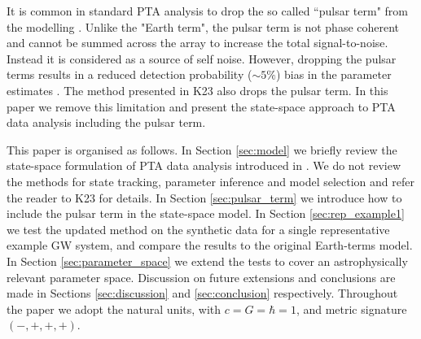 \documentclass[fleqn,usenatbib,useAMS]{mnras}
\begin{document}
 
 
 It is common in standard PTA analysis to drop the so called ``pulsar term" from the modelling \citep[e.g.][]{Sesana2010,Babak2012,Petiteau2013,Zhu2015,Taylors2016,Goldstein2018,Charisi2023arXiv230403786C}. Unlike the "Earth term", the pulsar term is not phase coherent and cannot be summed across the array to increase the total signal-to-noise. Instead it is considered as a source of self noise. However, dropping the pulsar terms results in a reduced detection probability ($\sim 5 \%$) bias in the parameter estimates \citep{Zhupulsarterms,Chen2022}. The method presented in K23 also drops the pulsar term. In this paper we remove this limitation and present the state-space approach to PTA data analysis including the pulsar term. \newline 
 
 
 This paper is organised as follows. In Section \ref{sec:model} we briefly review the state-space formulation of PTA data analysis introduced in \cite{K1}. We do not review the methods for state tracking, parameter inference and model selection and refer the reader to K23 for details. In Section \ref{sec:pulsar_term} we introduce how to include the pulsar term in the state-space model. In Section \ref{sec:rep_example1} we test the updated method on the synthetic data for a single representative example GW system, and compare the results to the original Earth-terms model. In Section \ref{sec:parameter_space} we extend the tests to cover an astrophysically relevant parameter space. Discussion on future extensions and conclusions are made in Sections \ref{sec:discussion} and \ref{sec:conclusion} respectively. Throughout the paper we adopt the natural units, with $c = G = \hbar = 1$, and metric signature $(-,+,+,+)$. \newline 
 


\end{document}

